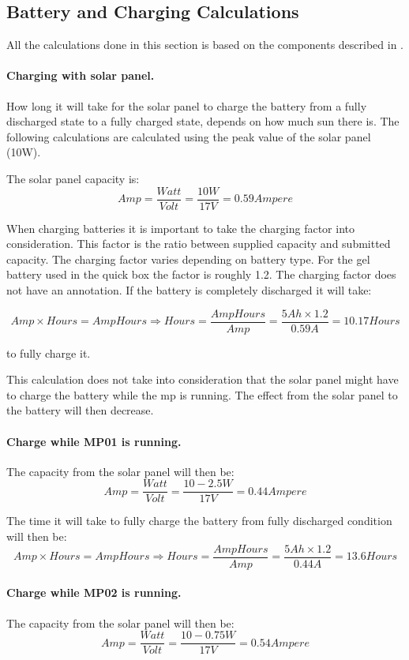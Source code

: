 \clearpage

\subsection{Battery and Charging Calculations}
All the calculations done in this section is based on the components described in . 

\paragraph{Charging with solar panel.}
How long it will take for the solar panel to charge the battery from a fully discharged state to a fully charged state, depends on how much sun there is. The following calculations are calculated using the peak value of the solar panel (10W). 

The solar panel capacity is:
$$Amp = \frac{Watt}{Volt} = \frac{10 W}{17 V} = 0.59 Ampere$$

When charging batteries it is important to take the charging factor into consideration. This factor is the ratio between supplied capacity and submitted capacity. The charging factor varies depending on battery type. For the gel battery used in the \gls{quick} box the factor is roughly 1.2. The charging factor does not have an annotation. 
If the battery is completely discharged it will take: 

$$Amp\times Hours = AmpHours \Rightarrow Hours =\frac{AmpHours}{Amp} = \frac{5 Ah\times 1.2}{0.59 A} = 10.17 Hours$$

to fully charge it. 

This calculation does not take into consideration that the solar panel might have to charge the battery while the \gls{mp} is running. The effect from the solar panel to the battery will then decrease. 

\paragraph{Charge while MP01 is running.}
The capacity from the solar panel will then be: 
$$Amp = \frac{Watt}{Volt} = \frac{10-2.5 W}{17 V} = 0.44 Ampere$$

The time it will take to fully charge the battery from fully discharged condition will then be: 
$$Amp\times Hours = AmpHours \Rightarrow Hours =\frac{AmpHours}{Amp} = \frac{5 Ah\times 1.2}{0.44A} = 13.6 Hours$$

\paragraph{Charge while MP02 is running.}
The capacity from the solar panel will then be: 
$$Amp = \frac{Watt}{Volt} = \frac{10-0.75 W}{17 V} = 0.54 Ampere$$

